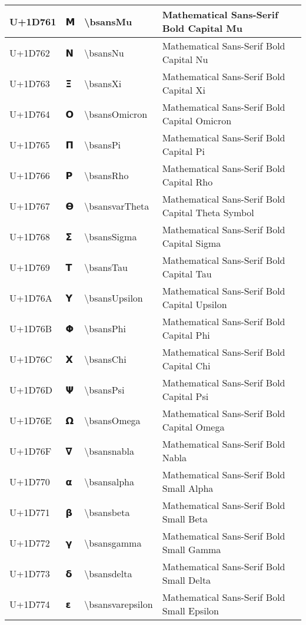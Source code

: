 \begin{table}[h]
\begin{tabulary}{\linewidth}{|L|L|L|L|}
\hline
U+1D761 & 𝝡 & {\textbackslash}bsansMu & Mathematical Sans-Serif Bold Capital Mu \\
\hline
U+1D762 & 𝝢 & {\textbackslash}bsansNu & Mathematical Sans-Serif Bold Capital Nu \\
\hline
U+1D763 & 𝝣 & {\textbackslash}bsansXi & Mathematical Sans-Serif Bold Capital Xi \\
\hline
U+1D764 & 𝝤 & {\textbackslash}bsansOmicron & Mathematical Sans-Serif Bold Capital Omicron \\
\hline
U+1D765 & 𝝥 & {\textbackslash}bsansPi & Mathematical Sans-Serif Bold Capital Pi \\
\hline
U+1D766 & 𝝦 & {\textbackslash}bsansRho & Mathematical Sans-Serif Bold Capital Rho \\
\hline
U+1D767 & 𝝧 & {\textbackslash}bsansvarTheta & Mathematical Sans-Serif Bold Capital Theta Symbol \\
\hline
U+1D768 & 𝝨 & {\textbackslash}bsansSigma & Mathematical Sans-Serif Bold Capital Sigma \\
\hline
U+1D769 & 𝝩 & {\textbackslash}bsansTau & Mathematical Sans-Serif Bold Capital Tau \\
\hline
U+1D76A & 𝝪 & {\textbackslash}bsansUpsilon & Mathematical Sans-Serif Bold Capital Upsilon \\
\hline
U+1D76B & 𝝫 & {\textbackslash}bsansPhi & Mathematical Sans-Serif Bold Capital Phi \\
\hline
U+1D76C & 𝝬 & {\textbackslash}bsansChi & Mathematical Sans-Serif Bold Capital Chi \\
\hline
U+1D76D & 𝝭 & {\textbackslash}bsansPsi & Mathematical Sans-Serif Bold Capital Psi \\
\hline
U+1D76E & 𝝮 & {\textbackslash}bsansOmega & Mathematical Sans-Serif Bold Capital Omega \\
\hline
U+1D76F & 𝝯 & {\textbackslash}bsansnabla & Mathematical Sans-Serif Bold Nabla \\
\hline
U+1D770 & 𝝰 & {\textbackslash}bsansalpha & Mathematical Sans-Serif Bold Small Alpha \\
\hline
U+1D771 & 𝝱 & {\textbackslash}bsansbeta & Mathematical Sans-Serif Bold Small Beta \\
\hline
U+1D772 & 𝝲 & {\textbackslash}bsansgamma & Mathematical Sans-Serif Bold Small Gamma \\
\hline
U+1D773 & 𝝳 & {\textbackslash}bsansdelta & Mathematical Sans-Serif Bold Small Delta \\
\hline
U+1D774 & 𝝴 & {\textbackslash}bsansvarepsilon & Mathematical Sans-Serif Bold Small Epsilon \\

\end{tabulary}
\end{table}
